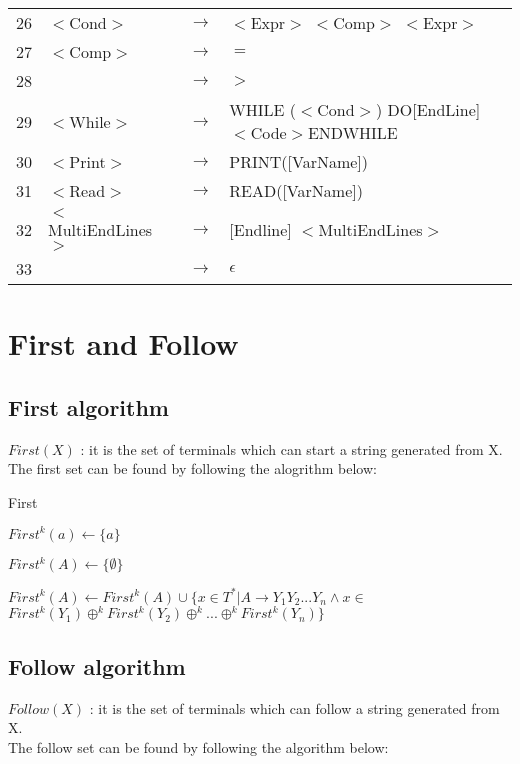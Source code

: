 \documentclass{article}
\begin{document}
\begin{center}
\begin{tabular}{|m{0.5cm} m{2.5cm} m{0.5cm} m{12cm}|}
26 & $<$Cond$>$ & $\to$ & $<$Expr$>$ $<$Comp$>$ $<$Expr$>$\\
27 & $<$Comp$>$ & $\to$ & $=$\\
28 & & $\to$ & $>$\\
29 & $<$While$>$ & $\to$ & WHILE ($<$Cond$>$) DO[EndLine] $<$Code$>$ENDWHILE\\
30 & $<$Print$>$ & $\to$ & PRINT([VarName])\\
31 & $<$Read$>$ & $\to$ & READ([VarName])\\

32 & $<$MultiEndLines$>$ & $\to$ & [Endline] $<$MultiEndLines$>$ \\
33 & & $\to$ & $\epsilon$ \\

\hline
\end{tabular}
\end{center}

\section{First and Follow}
\subsection{First algorithm}
$First(X)$ : it is the set of terminals which can start a string generated from X.\\
The first set can be found by following the alogrithm below:

\begin{algorithm}[H]
\caption{First}
\begin{algorithmic}
    \STATE $First^k (a) \gets \{a\}$
\ENDFOR

    \STATE $First^k (A) \gets \{\emptyset\}$
\ENDFOR

\REPEAT
        \STATE $First^k (A) \gets First^k(A) \cup \{x \in T^* | A \to Y_1 Y_2 ... Y_n \wedge x \in$
        \STATE $First^k(Y_1) \oplus^k First^k(Y_2) \oplus^k ... \oplus^k First^k(Y_n)\}$
    \ENDFOR
{}
\end{algorithmic}
\end{algorithm}

\subsection{Follow algorithm}
$Follow(X)$ : it is the set of terminals which can follow a string generated from X. \\
The follow set can be found by following the algorithm below:
\end{document}
